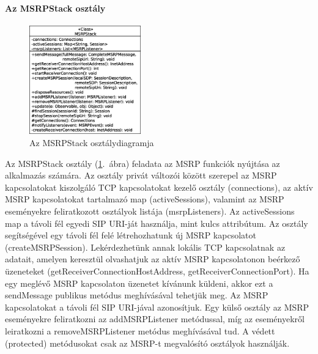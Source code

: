 \paragraph{Az MSRPStack osztály\\}
\label{sec:msrp_stack}

\begin{figure}
  \vspace{-15pt}
  \begin{center}
    \includegraphics[width=0.43\textwidth]{img/class_diagrams/MSRPStack.eps}
  \end{center}
  \vspace{-15pt}
  \captionsetup{font=scriptsize}
  \caption{Az MSRPStack osztálydiagramja}
  \label{fig:class_msrp_stack}
  \vspace{-10pt}
\end{figure}
Az MSRPStack osztály (\ref{fig:class_msrp_stack}.~ábra) feladata az MSRP funkciók nyújtása az alkalmazás számára. Az osztály privát változói között szerepel az MSRP kapcsolatokat kiszolgáló TCP kapcsolatokat kezelő osztály (connections), az aktív MSRP kapcsolatokat tartalmazó map (activeSessions), valamint az MSRP eseményekre feliratkozott osztályok listája (msrpListeners). Az activeSessions map a távoli fél egyedi SIP URI-ját használja, mint kulcs attribútum. Az osztály segítségével egy távoli fél felé létrehozhatunk új MSRP kapcsolatot (\mbox{createMSRPSession}). Lekérdezhetünk annak lokális TCP kapcsolatnak az adatait, amelyen keresztül olvashatjuk az aktív MSRP kapcsolatonon beérkező üzeneteket (getReceiverConnectionHostAddress, getReceiverConnectionPort). Ha egy meglévő MSRP kapcsolaton üzenetet kívánunk küldeni, akkor ezt a sendMessage publikus metódus meghívásával tehetjük meg. Az MSRP kapcsolatokat a távoli fél SIP URI-jával azonosítjuk. Egy külső osztály az MSRP eseményekre feliratkozni az addMSRPListener metódussal, míg az eseményekről leiratkozni a removeMSRPListener metódus meghívásával tud. A védett (protected) metódusokat csak az MSRP-t megvalósító osztályok használják.

